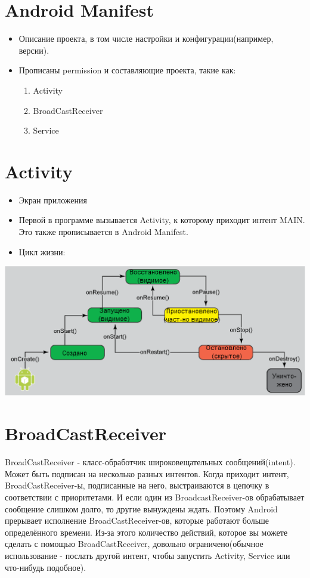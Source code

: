 \documentclass[12 pt]{article}
\begin{document}
\section{Android Manifest}
    \begin{itemize}
    	\item Описание проекта, в том числе настройки и конфигурации(например, версии).
    	\item Прописаны permission и составляющие проекта, такие как:
		\begin{enumerate}
        	\item Activity 
        	\item BroadCastReceiver 
        	\item Service
        \end{enumerate}
    \end{itemize}

\section{Activity}
    \begin{itemize}
    	\item Экран приложения
        \item Первой в программе вызывается Activity, к которому приходит интент MAIN. Это также прописывается в Android Manifest.
    	\item Цикл жизни:
   	\end{itemize}
	\includegraphics{LifeCycle.png}
    
\section{BroadCastReceiver} 
    
    BroadCastReceiver - класс-обработчик широковещательных сообщений(intent). Может быть подписан на несколько разных интентов. Когда приходит интент, BroadCastReceiver-ы, подписанные на него, выстраиваются в цепочку в соответствии с приоритетами. И если один из BroadcastReceiver-ов обрабатывает сообщение слишком долго, то другие вынуждены ждать. Поэтому Android прерывает исполнение BroadCastReceiver-ов, которые работают больше определённого времени. Из-за этого количество действий, которое вы можете сделать с помощью BroadCastReceiver, довольно ограничено(обычное использование - послать другой интент, чтобы запустить Activity, Service или что-нибудь подобное).
    
\end{document}
